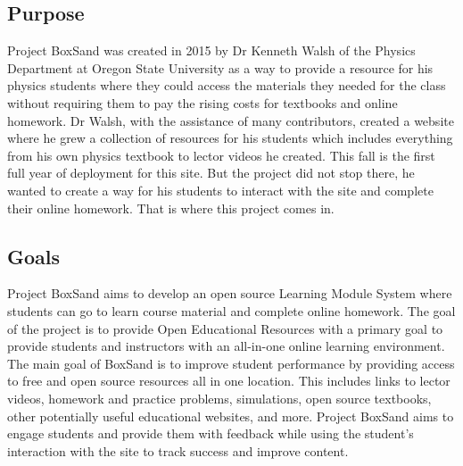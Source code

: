 \documentclass[onecolumn, draftclsnofoot,10pt, compsoc]{IEEEtran}
\begin{document}
\subsection{Purpose}
Project BoxSand was created in 2015 by Dr Kenneth Walsh of the Physics Department at Oregon State University as a way to provide a resource for his physics students where they could access the materials they needed for the class without requiring them to pay the rising costs for textbooks and online homework. Dr Walsh, with the assistance of many contributors, created a website where he grew a collection of resources for his students which includes everything from his own physics textbook to lector videos he created. This fall is the first full year of deployment for this site. But the project did not stop there, he wanted to create a way for his students to interact with the site and complete their online homework. That is where this project comes in.

\subsection{Goals}
Project BoxSand aims to develop an open source Learning Module System where students can go to learn course material and complete online homework. The goal of the project is to provide Open Educational Resources with a primary goal to provide students and instructors with an all-in-one online learning environment. The main goal of BoxSand is to improve student performance by providing access to free and open source resources all in one location. This includes links to lector videos, homework and practice problems, simulations, open source textbooks, other potentially useful educational websites, and more. Project BoxSand aims to engage students and provide them with feedback while using the student's interaction with the site to track success and improve content.
\end{document}
